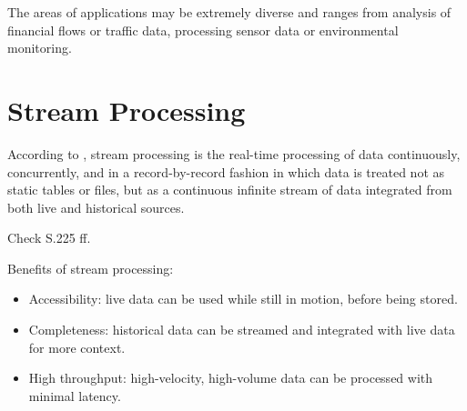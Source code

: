 
The areas of applications may be extremely diverse and ranges from analysis of financial flows or traffic data, processing
sensor data or environmental monitoring.


%

\section{Stream Processing}
According to \cite{Klepp16}, stream processing is the real-time processing of data continuously,
concurrently, and in a record-by-record fashion in which data is treated not as static tables
or files, but as a continuous infinite stream of data integrated from both live and historical
sources.

Check \cite{Marz15} S.225 ff.


Benefits of stream processing:

\begin{itemize}
	\item Accessibility: live data can be used while still in motion, before being stored.
	\item Completeness: historical data can be streamed and integrated with live data for more context.
	\item High throughput: high-velocity, high-volume data can be processed with minimal latency.
\end{itemize}

